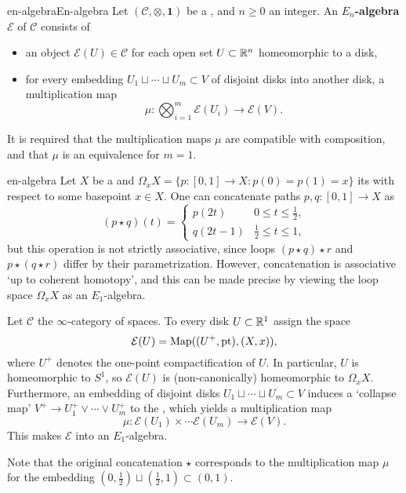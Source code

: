\begin{topic}{en-algebra}{En-algebra}
    Let $(\mathcal{C}, \otimes, \textbf{1})$ be a  , and $n \ge 0$ an integer. An \textbf{$E_n$-algebra} $\mathcal{E}$ of $\mathcal{C}$ consists of
    \begin{itemize}
        \item an object $\mathcal{E}(U) \in \mathcal{C}$ for each open set $U \subset \mathbb{R}^n$ homeomorphic to a disk,
        \item for every embedding $U_1 \sqcup \cdots \sqcup U_m \subset V$ of disjoint disks into another disk, a multiplication map
        \[ \mu : \bigotimes_{i = 1}^{m} \mathcal{E}(U_i) \to \mathcal{E}(V) . \]
    \end{itemize}
    It is required that the multiplication maps $\mu$ are compatible with composition, and that $\mu$ is an equivalence for $m = 1$.
\end{topic}

\begin{example}{en-algebra}
    Let $X$ be a  and $\Omega_x X = \{ p : [0, 1] \to X : p(0) = p(1) = x \}$ its  with respect to some basepoint $x \in X$. One can concatenate paths $p, q : [0, 1] \to X$ as
    \[ (p \star q)(t) = \left\{ \begin{array}{cl}
         p(2t) & 0 \le t \le \tfrac{1}{2} , \\
         q(2t - 1) & \tfrac{1}{2} \le t \le 1 ,
    \end{array} \right. \]
    but this operation is not strictly associative, since loops $(p \star q) \star r$ and $p \star (q \star r)$ differ by their parametrization. However, concatenation is associative `up to coherent homotopy', and this can be made precise by viewing the loop space $\Omega_x X$ as an $E_1$-algebra.
    
    Let $\mathcal{C}$ the $\infty$-category of spaces. To every disk $U \subset \mathbb{R}^1$ assign the space
    \[ \mathcal{E}(U) = \textup{Map}((U^+, \textup{pt}), (X, x)) , \]
    where $U^+$ denotes the one-point compactification of $U$. In particular, $U$ is homeomorphic to $S^1$, so $\mathcal{E}(U)$ is (non-canonically) homeomorphic to $\Omega_x X$. Furthermore, an embedding of disjoint disks $U_1 \sqcup \cdots \sqcup U_m \subset V$ induces a `collapse map' $V^+ \to U_1^+ \vee \cdots \vee U_m^+$ to the , which yields a multiplication map
    \[ \mu : \mathcal{E}(U_1) \times \cdots \mathcal{E}(U_m) \to \mathcal{E}(V) . \]
    This makes $\mathcal{E}$ into an $E_1$-algebra.
    
    Note that the original concatenation $\star$ corresponds to the multiplication map $\mu$ for the embedding $(0, \tfrac{1}{2}) \sqcup (\tfrac{1}{2}, 1) \subset (0, 1)$.
\end{example}

